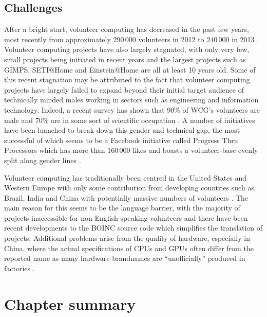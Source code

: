 \subsection{Challenges} \label{Bchallenges}
After a bright start, volunteer computing has decreased in the past few years, most recently from approximately $290\,000$ volunteers in 2012 to $240\,000$ in 2013 \cite{anderson2013}. Volunteer computing projects have also largely stagnated, with only very few, small projects being initiated in recent years  and the largest projects such as GIMPS, SETI@Home and Einstein@Home are all at least 10 years old. Some of this recent stagnation may be attributed to the fact that volunteer computing projects have largely failed to expand beyond their initial target audience of technically minded males working in sectors such as engineering and information technology. Indeed, a recent survey has shown that 90\% of WCG's volunteers are male and 70\% are in some sort of scientific occupation \cite{wcg2013}. A number of initiatives have been luanched to break down this gender and technical gap, the most successful of which seems to be a Facebook \cite{facebook} initiative called Progress Thru Processors which has more than $160\,000$ likes and boasts a volunteer-base evenly split along gender lines \cite{ptp2013}.

Volunteer computing has traditionally been centred in the United States and Western Europe with only some contribution  from developing countries such as Brazil, India and China with potentially massive numbers of volunteers \cite{wcg2013}. The main reason for this seems to be the language barrier, with the majority of projects inaccessible for non-English-speaking volunteers \cite{china2013} and there have been recent developments to the BOINC source code which simplifies the translation of projects. Additional problems arise from the quality of hardware, especially in China, where the actual specifications of CPUs and GPUs often differ from the reported name as many hardware brandnames are ``unofficially'' produced in factories \cite{keith}. 

 



\section{Chapter summary}